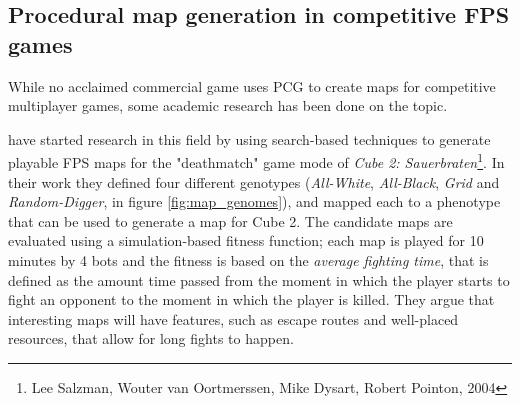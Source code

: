 \documentclass{Configuration_Files/PoliMi3i_thesis}
\begin{document}
\subsection{Procedural map generation in competitive FPS games}
\label{subsec:pcg_fps}
While no acclaimed commercial game uses PCG to create maps for competitive multiplayer games, some academic research has been done on the topic.

\citeauthor{cardamone_evolving_2011} have started research in this field by using search-based techniques to generate playable FPS maps for the "deathmatch" game mode of \textit{Cube 2: Sauerbraten}\footnote{Lee Salzman, Wouter van Oortmerssen, Mike Dysart, Robert Pointon, 2004}. In their work they defined four different genotypes (\textit{All-White}, \textit{All-Black}, \textit{Grid} and \textit{Random-Digger}, in figure \ref{fig:map_genomes}), and mapped each to a phenotype that can be used to generate a map for Cube 2. The candidate maps are evaluated using a simulation-based fitness function; each map is played for 10 minutes by 4 bots and the fitness is based on the \textit{average fighting time}, that is defined as the amount time passed from the moment in which the player starts to fight an opponent to the moment in which the player is killed. They argue that interesting maps will have features, such as escape routes and well-placed resources, that allow for long fights to happen. \cite{cardamone_evolving_2011}
\end{document}
